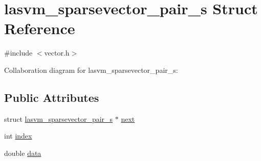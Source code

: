 \hypertarget{structlasvm__sparsevector__pair__s}{\section{lasvm\+\_\+sparsevector\+\_\+pair\+\_\+s Struct Reference}
\label{structlasvm__sparsevector__pair__s}
}


{\ttfamily \#include $<$vector.\+h$>$}



Collaboration diagram for lasvm\+\_\+sparsevector\+\_\+pair\+\_\+s\+:
\subsection*{Public Attributes}
\begin{DoxyCompactItemize}
\item 
struct \hyperlink{structlasvm__sparsevector__pair__s}{lasvm\+\_\+sparsevector\+\_\+pair\+\_\+s} $\ast$ \hyperlink{structlasvm__sparsevector__pair__s_a00bf7ee1e8a4795a54a0262e2c23a12d}{next}
\item 
int \hyperlink{structlasvm__sparsevector__pair__s_abea76f13ce94e14c5dfb2fb3e58ab310}{index}
\item 
double \hyperlink{structlasvm__sparsevector__pair__s_a0409c8256b7cd0877381edd094dc626a}{data}
\end{DoxyCompactItemize}


